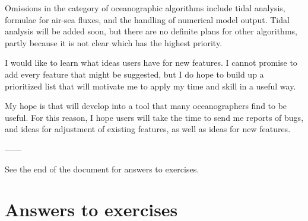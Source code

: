 \documentclass{article}
\begin{document}
Omissions in the category of oceanographic algorithms include tidal analysis, formulae for air-sea
fluxes, and the handling of numerical model output. Tidal analysis will be added soon, but there are
no definite plans for other algorithms, partly because it is not clear which has the highest
priority.

I would like to learn what ideas \verb@oce@ users have for new features. I cannot promise to add
every feature that might be suggested, but I do hope to build up a prioritized list that will
motivate me to apply my time and skill in a useful way.

My hope is that \verb@oce@ will develop into a tool that many oceanographers find to be useful. For
this reason, I hope \verb@oce@ users will take the time to send me reports of bugs, and ideas for
adjustment of existing features, as well as ideas for new features.

\begin{center}

\vspace{2cm}

------

\vspace{2cm}

See the end of the document for answers to exercises.

\end{center}



\newpage	
	
\section*{Answers to exercises}
\end{document}
